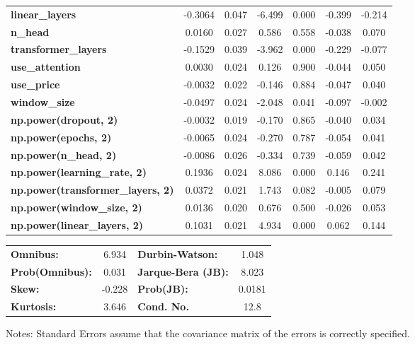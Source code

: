 \begin{center}
\begin{tabular}{lcccccc}
\textbf{linear\_layers}                   &      -0.3064  &        0.047     &    -6.499  &         0.000        &       -0.399    &       -0.214     \\
\textbf{n\_head}                          &       0.0160  &        0.027     &     0.586  &         0.558        &       -0.038    &        0.070     \\
\textbf{transformer\_layers}              &      -0.1529  &        0.039     &    -3.962  &         0.000        &       -0.229    &       -0.077     \\
\textbf{use\_attention}                   &       0.0030  &        0.024     &     0.126  &         0.900        &       -0.044    &        0.050     \\
\textbf{use\_price}                       &      -0.0032  &        0.022     &    -0.146  &         0.884        &       -0.047    &        0.040     \\
\textbf{window\_size}                     &      -0.0497  &        0.024     &    -2.048  &         0.041        &       -0.097    &       -0.002     \\
\textbf{np.power(dropout, 2)}             &      -0.0032  &        0.019     &    -0.170  &         0.865        &       -0.040    &        0.034     \\
\textbf{np.power(epochs, 2)}              &      -0.0065  &        0.024     &    -0.270  &         0.787        &       -0.054    &        0.041     \\
\textbf{np.power(n\_head, 2)}             &      -0.0086  &        0.026     &    -0.334  &         0.739        &       -0.059    &        0.042     \\
\textbf{np.power(learning\_rate, 2)}      &       0.1936  &        0.024     &     8.086  &         0.000        &        0.146    &        0.241     \\
\textbf{np.power(transformer\_layers, 2)} &       0.0372  &        0.021     &     1.743  &         0.082        &       -0.005    &        0.079     \\
\textbf{np.power(window\_size, 2)}        &       0.0136  &        0.020     &     0.676  &         0.500        &       -0.026    &        0.053     \\
\textbf{np.power(linear\_layers, 2)}      &       0.1031  &        0.021     &     4.934  &         0.000        &        0.062    &        0.144     \\
\bottomrule
\end{tabular}
\begin{tabular}{lclc}
\textbf{Omnibus:}       &  6.934 & \textbf{  Durbin-Watson:     } &    1.048  \\
\textbf{Prob(Omnibus):} &  0.031 & \textbf{  Jarque-Bera (JB):  } &    8.023  \\
\textbf{Skew:}          & -0.228 & \textbf{  Prob(JB):          } &   0.0181  \\
\textbf{Kurtosis:}      &  3.646 & \textbf{  Cond. No.          } &     12.8  \\
\bottomrule
\end{tabular}
\end{center}

Notes: \newline
 [1] Standard Errors assume that the covariance matrix of the errors is correctly specified.